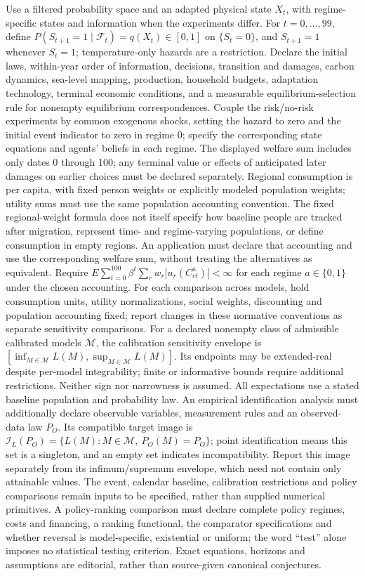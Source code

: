 \documentclass[11pt,a4paper]{article}
\begin{document}
Use a filtered probability space and an adapted physical state \(X_t\), with regime-specific states and information when the experiments differ. For \(t=0,\ldots,99\), define \(P(S_{t+1}=1\mid\mathcal F_t)=q(X_t)\in[0,1]\) on \(\{S_t=0\}\), and \(S_{t+1}=1\) whenever \(S_t=1\); temperature-only hazards are a restriction. Declare the initial laws, within-year order of information, decisions, transition and damages, carbon dynamics, sea-level mapping, production, household budgets, adaptation technology, terminal economic conditions, and a measurable equilibrium-selection rule for nonempty equilibrium correspondences. Couple the risk/no-risk experiments by common exogenous shocks, setting the hazard to zero and the initial event indicator to zero in regime 0; specify the corresponding state equations and agents' beliefs in each regime. The displayed welfare sum includes only dates 0 through 100; any terminal value or effects of anticipated later damages on earlier choices must be declared separately. Regional consumption is per capita, with fixed person weights or explicitly modeled population weights; utility sums must use the same population accounting convention. The fixed regional-weight formula does not itself specify how baseline people are tracked after migration, represent time- and regime-varying populations, or define consumption in empty regions. An application must declare that accounting and use the corresponding welfare sum, without treating the alternatives as equivalent. Require \(E\sum_{t=0}^{100}\beta^t\sum_r w_r|u_r(C_{rt}^a)|<\infty\) for each regime \(a\in\{0,1\}\) under the chosen accounting. For each comparison across models, hold consumption units, utility normalizations, social weights, discounting and population accounting fixed; report changes in these normative conventions as separate sensitivity comparisons. For a declared nonempty class of admissible calibrated models \(\mathcal M\), the calibration sensitivity envelope is \([\inf_{M\in\mathcal M}L(M),\sup_{M\in\mathcal M}L(M)]\). Its endpoints may be extended-real despite per-model integrability; finite or informative bounds require additional restrictions. Neither sign nor narrowness is assumed. All expectations use a stated baseline population and probability law. An empirical identification analysis must additionally declare observable variables, measurement rules and an observed-data law \(P_O\). Its compatible target image is \(\mathcal I_L(P_O)=\{L(M):M\in\mathcal M,\ P_O(M)=P_O\}\); point identification means this set is a singleton, and an empty set indicates incompatibility. Report this image separately from its infimum/supremum envelope, which need not contain only attainable values. The event, calendar baseline, calibration restrictions and policy comparisons remain inputs to be specified, rather than supplied numerical primitives. A policy-ranking comparison must declare complete policy regimes, costs and financing, a ranking functional, the comparator specifications and whether reversal is model-specific, existential or uniform; the word ``test'' alone imposes no statistical testing criterion. Exact equations, horizons and assumptions are editorial, rather than source-given canonical conjectures.
\end{document}
